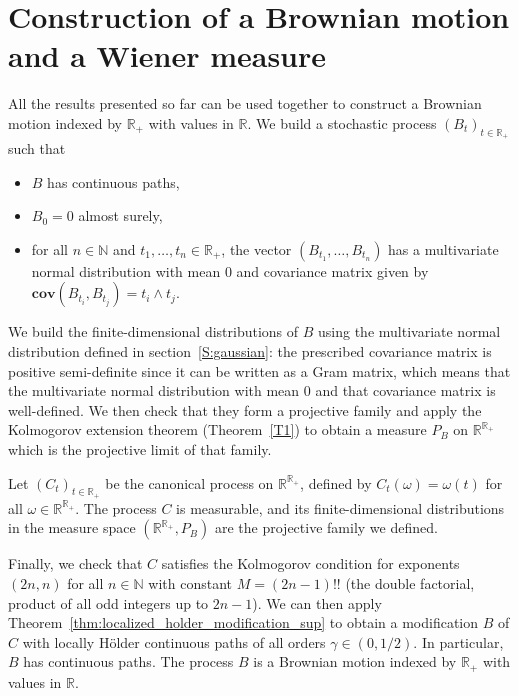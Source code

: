 \documentclass[lean]{Draft}
\begin{document}
\section{Construction of a Brownian motion and a Wiener measure}
\label{S:BM}

All the results presented so far can be used together to construct a Brownian motion indexed by $\mathbb{R}_+$ with values in $\mathbb{R}$.
We build a stochastic process $(B_t)_{t \in \mathbb{R}_+}$ such that
\begin{itemize}
  \item $B$ has continuous paths,
  \item $B_0 = 0$ almost surely,
  \item for all $n \in \mathbb{N}$ and $t_1, \ldots, t_n \in \mathbb{R}_+$, the vector $(B_{t_1}, \ldots, B_{t_n})$ has a multivariate normal distribution with mean $0$ and covariance matrix given by $\mathbf{cov}(B_{t_i}, B_{t_j}) = t_i \wedge t_j$.
\end{itemize}

We build the finite-dimensional distributions of $B$ using the multivariate normal distribution defined in section~\ref{S:gaussian}: the prescribed covariance matrix is positive semi-definite since it can be written as a Gram matrix, which means that the multivariate normal distribution with mean 0 and that covariance matrix is well-defined.
We then check that they form a projective family and apply the Kolmogorov extension theorem (Theorem~\ref{T1}) to obtain a measure $P_B$ on $\mathbb{R}^{\mathbb{R}_+}$ which is the projective limit of that family.

Let $(C_t)_{t \in \mathbb{R}_+}$ be the canonical process on $\mathbb{R}^{\mathbb{R}_+}$, defined by $C_t(\omega) = \omega(t)$ for all $\omega \in \mathbb{R}^{\mathbb{R}_+}$.
The process $C$ is measurable, and its finite-dimensional distributions in the measure space $(\mathbb{R}^{\mathbb{R}_+}, P_B)$ are the projective family we defined.

Finally, we check that $C$ satisfies the Kolmogorov condition for exponents $(2n, n)$ for all $n \in \mathbb{N}$ with constant $M = (2n - 1)!!$ (the double factorial, product of all odd integers up to $2n - 1$).
We can then apply Theorem~\ref{thm:localized_holder_modification_sup} to obtain a modification $B$ of $C$ with locally Hölder continuous paths of all orders $\gamma \in (0, 1/2)$.
In particular, $B$ has continuous paths.
The process $B$ is a Brownian motion indexed by $\mathbb{R}_+$ with values in $\mathbb{R}$.
\end{document}
